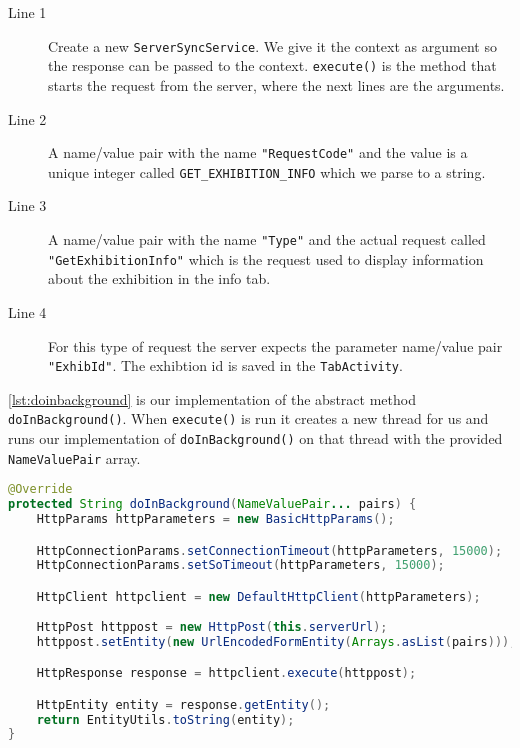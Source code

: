 \begin{description}
\item[Line 1] Create a new \lstinline|ServerSyncService|. We give it the context as argument so the response can be passed to the context. \lstinline|execute()| is the method that starts the request from the server, where the next lines are the arguments.
\item[Line 2] A name/value pair with the name \lstinline|"RequestCode"| and the value is a unique integer called \lstinline|GET_EXHIBITION_INFO| which we parse to a string.
\item[Line 3] A name/value pair with the name \lstinline|"Type"| and the actual request called \lstinline|"GetExhibitionInfo"| which is the request used to display information about the exhibition in the info tab.
\item[Line 4] For this type of request the server expects the parameter name/value pair \lstinline|"ExhibId"|. The exhibtion id is saved in the \lstinline|TabActivity|.
\end{description}
\autoref{lst:doinbackground} is our implementation of the abstract method \lstinline|doInBackground()|. When \lstinline|execute()| is run it creates a new thread for us and runs our implementation of \lstinline|doInBackground()| on that thread with the provided \lstinline|NameValuePair| array.

\begin{lstlisting}[language=java, label=lst:doinbackground, caption={The async abstract method \lstinline|doInBackground()|}]
@Override
protected String doInBackground(NameValuePair... pairs) {
    HttpParams httpParameters = new BasicHttpParams();

    HttpConnectionParams.setConnectionTimeout(httpParameters, 15000);
    HttpConnectionParams.setSoTimeout(httpParameters, 15000);

    HttpClient httpclient = new DefaultHttpClient(httpParameters);
    
    HttpPost httppost = new HttpPost(this.serverUrl);
    httppost.setEntity(new UrlEncodedFormEntity(Arrays.asList(pairs)));

    HttpResponse response = httpclient.execute(httppost);

    HttpEntity entity = response.getEntity();
    return EntityUtils.toString(entity);
}
\end{lstlisting}

